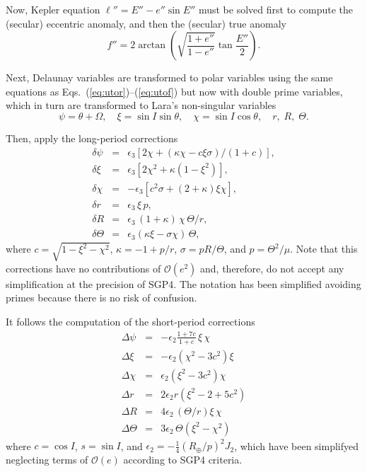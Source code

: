\documentclass{article}
\begin{document}
Now, Kepler equation $\ell''=E''-e''\sin{E}''$ must be solved first to compute the (secular) eccentric anomaly, and then the (secular) true anomaly
\[
f''=2\arctan\left(\sqrt{\frac{1+e''}{1-e''}}\tan\frac{E''}{2}\right).
\]
\par

Next, Delaunay variables are transformed to polar variables using the same equations as Eqs.~(\ref{eq:utor})--(\ref{eq:utof}) but now with double prime variables, which in turn are transformed to Lara's non-singular variables
\[
\psi=\theta+\Omega,\quad \xi=\sin{I}\sin\theta,\quad \chi=\sin{I}\cos\theta,\quad r,\; R,\; \Theta.
\]


Then, apply the long-period corrections
\begin{eqnarray*} \label{eq:dyns}
\delta\psi &=& \epsilon_3\left[2 \chi+(\kappa  \chi -c \xi  \sigma)/(1+c)\right],
\\  \label{eq:dxins}
\delta\xi &=&
\epsilon_3\left[2 \chi ^2+\kappa  \left(1-\xi ^2\right) \right],
\\ \label{eq:dchins}
\delta\chi &=& %
-\epsilon_3\left[c^2 \sigma +(2+\kappa) \xi  \chi \right],
\\ \label{eq:drns}
\delta{r} &=& \epsilon_3\,\xi\,p,
\\ \label{eq:dRRns}
\delta{R} &=& %
\epsilon_3\,(1+\kappa)\,\chi\,\Theta/r,
\\ \label{eq:dZZns}
\delta\Theta &=&\epsilon_3(\kappa\xi-\sigma\chi)\,\Theta,
\end{eqnarray*}
where $c=\sqrt{1-\xi^2-\chi^2}$, $\kappa=-1+p/r$, $\sigma=pR/\Theta$, and $p=\Theta^2/\mu$. Note that this corrections have no contributions of $\mathcal{O}(e^2)$ and, therefore, do not accept any simplification at the precision of SGP4. The notation has been simplified avoiding primes because there is no risk of confusion.
\par


It follows the computation of the short-period corrections
\begin{eqnarray*} \label{lspc}
\Delta\psi &=& -\epsilon_2\frac{1+7c}{1+c}\,\xi\,\chi
\\
\Delta\xi &=& -\epsilon_2\left(\chi^2-3c^2\right)\xi
\\[1ex]
\Delta\chi &=& \epsilon_2\left(\xi^2-3c^2\right)\chi
\\
\Delta{r} &=& %
2\epsilon_2r\left(\xi^2-2+5c^2\right)
\\
\Delta{R} &=& %
4\epsilon_2\,(\Theta/r)\xi\,\chi
\\
\Delta\Theta &=&  3\epsilon_2\,\Theta(\xi^2-\chi^2)
\end{eqnarray*}
where $c=\cos{I}$, $s=\sin{I}$, and $\epsilon_2=-\frac{1}{4}(R_\oplus/p)^2J_2$, which have been simplifyed neglecting terms of $\mathcal{O}(e)$ according to SGP4 criteria.
\par
\end{document}
